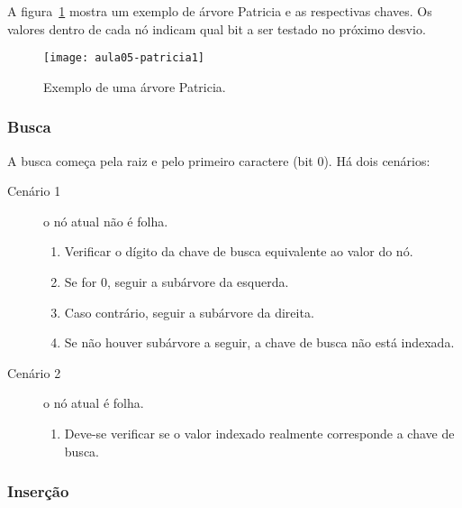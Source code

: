 A figura~\ref{aula05:fig:patricia1} mostra um exemplo de árvore Patricia e as
respectivas chaves.
Os valores dentro de cada nó indicam qual bit a ser testado no próximo desvio.
%
\begin{figure}[!htb]
\centering
\texttt{[image: aula05-patricia1]}
\caption{Exemplo de uma árvore Patricia.}
\label{aula05:fig:patricia1}
\end{figure}

\subsubsection{Busca}

A busca começa pela raiz e pelo primeiro caractere (bit 0). 
Há dois cenários:
\begin{description}
\item[Cenário 1] o nó atual não é folha.
	\begin{enumerate}
	\item Verificar o dígito da chave de busca equivalente ao valor do nó.
	\item Se for 0, seguir a subárvore da esquerda.
	\item Caso contrário, seguir a subárvore da direita.
	\item Se não houver subárvore a seguir, a chave de busca não está indexada.
	\end{enumerate}

\item[Cenário 2] o nó atual é folha.
	\begin{enumerate}
	\item Deve-se verificar se o valor indexado realmente corresponde a chave de busca.
	\end{enumerate}
\end{description}

\subsubsection{Inserção}

